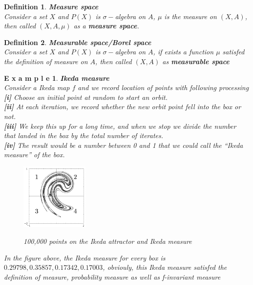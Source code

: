 \documentclass[12pt]{article}
\theoremstyle{plain}
\newtheorem{definition}{{\color{red}\textbf{Definition}}}[section]
\newtheorem{example}{\textbf{E x a m p l e}}[section]
\begin{document}
\begin{definition}\textbf{Measure space}
\\\noindent Consider a set $X$ and $P(X)$ is $\sigma -$algebra on $A$, $\mu$ is the measure on $(X, A)$, then called $(X, A, \mu)$ as a \textbf{measure space}.
\end{definition}



\begin{definition}\textbf{Measurable space/Borel space}
\\\noindent Consider a set $X$ and $P(X)$ is $\sigma -$algebra on $A$, if exists a function $\mu$ satisfed the definition of measure on $A$, then called $(X, A)$ as \textbf{measurable space}
\end{definition}


\begin{example}\textbf{Ikeda measure}
\\\noindent Consider a Ikeda map $f$ and we record location of points with following processing
\\\noindent \textbf{[i]} Choose an initial point at random to start an orbit. 
\\\noindent \textbf{[ii]} At each iteration, we record whether the new orbit point fell into the box or not.
\\\noindent \textbf{[iii]} We keep this up for a long time, and when we stop we divide the number that landed in the box by the total number of iterates.
\\\noindent \textbf{[iv]} The result would be a number between 0 and 1 that we could call the ``Ikeda measure'' of the box.

\begin{figure}[H]
\begin{center}
\includegraphics[width=0.3\textwidth]{figure/section7/Ikeda-measure.png} \\
\caption{100,000 points on the Ikeda attractor and Ikeda measure}
\end{center}
\end{figure}

In the figure above, the Ikeda measure for every box is $0.29798, 0.35857, 0.17342, 0.17003$, obviouly, this Ikeda measure satisfed the definition of measure, probability measure as well as f-invariant measure
\end{example}
\end{document}
